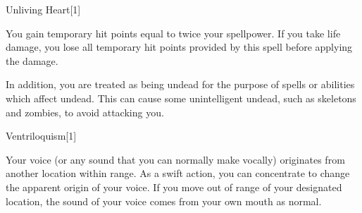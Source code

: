\begin{spellsection}{Unliving Heart}[1]
    \begin{spellheader}
    \end{spellheader}
    \begin{spellcontent}
        \begin{spelltargetinginfo}
        \end{spelltargetinginfo}
        \begin{spelleffects}
            \spelleffect You gain temporary hit points equal to twice your spellpower. If you take life damage, you lose all temporary hit points provided by this spell before applying the damage.

            In addition, you are treated as being undead for the purpose of spells or abilities which affect undead. This can cause some unintelligent undead, such as skeletons and zombies, to avoid attacking you.
            \spelldur \durlong
        \end{spelleffects}
    \end{spellcontent}
    \begin{spellfooter}
        \miscastexplode
    \end{spellfooter}
    \begin{spellaugments}
    \end{spellaugments}
\end{spellsection}

\begin{spellsection}{Ventriloquism}[1]
    \begin{spellheader}
    \end{spellheader}
    \begin{spellcontent}
        \begin{spelltargetinginfo}
            \spellrng{\rngmed}
        \end{spelltargetinginfo}
        \begin{spelleffects}
            \spelleffect Your voice (or any sound that you can normally make vocally) originates from another location within range. As a swift action, you can concentrate to change the apparent origin of your voice. If you move out of range of your designated location, the sound of your voice comes from your own mouth as normal.
            \spelldur \durshort \dismissable
        \end{spelleffects}
    \end{spellcontent}
    \begin{spellfooter}
        \miscastexplode
    \end{spellfooter}
\end{spellsection}

